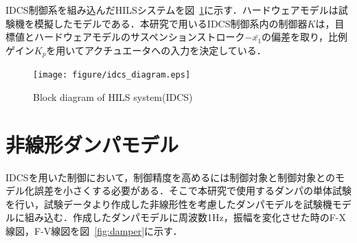 \documentclass{article_vdlab_sotsuron_youshi}
\begin{document}
IDCS制御系を組み込んだHILSシステムを図~\ref{fig:idcs_diagram}に示す．ハードウェアモデルは試験機を模擬したモデルである．本研究で用いるIDCS制御系内の制御器$K$は，目標値とハードウェアモデルのサスペンションストローク$-\bar{x_1}$の偏差を取り，比例ゲイン$K_p$を用いてアクチュエータへの入力を決定している．

\vspace*{3mm}
\begin{figure}[htp]
  \begin{center}
    \texttt{[image: figure/idcs\_diagram.eps]}
    \vspace*{1mm}
    \caption{Block diagram of HILS system(IDCS)}
    \label{fig:idcs_diagram}
  \end{center}
\end{figure}

\section{非線形ダンパモデル}
IDCSを用いた制御において，制御精度を高めるには制御対象と制御対象とのモデル化誤差を小さくする必要がある．そこで本研究で使用するダンパの単体試験を行い，試験データより作成した非線形性を考慮したダンパモデルを試験機モデルに組み込む．作成したダンパモデルに周波数1Hz，振幅を変化させた時のF-X線図，F-V線図を図~\ref{fig:damper}に示す．
\end{document}
